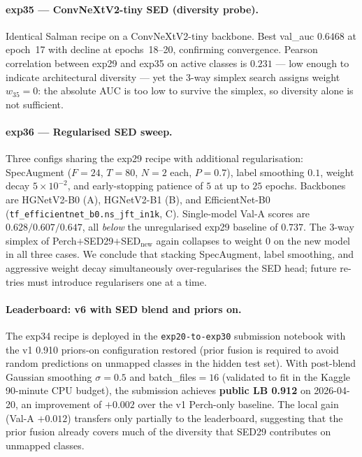 \paragraph{exp35 --- ConvNeXtV2-tiny SED (diversity probe).}
Identical Salman recipe on a ConvNeXtV2-tiny backbone. Best
val\_auc $0.6468$ at epoch~17 with decline at epochs~18--20, confirming
convergence. Pearson correlation between exp29 and exp35 on active
classes is $0.231$ --- low enough to indicate architectural diversity
--- yet the 3-way simplex search assigns weight $w_{35}{=}0$: the
absolute AUC is too low to survive the simplex, so diversity alone
is not sufficient.

\paragraph{exp36 --- Regularised SED sweep.}
Three configs sharing the exp29 recipe with additional regularisation:
SpecAugment ($F{=}24$, $T{=}80$, $N{=}2$ each, $P{=}0.7$), label
smoothing $0.1$, weight decay $5{\times}10^{-2}$, and early-stopping
patience of $5$ at up to $25$ epochs. Backbones are HGNetV2-B0 (A),
HGNetV2-B1 (B), and EfficientNet-B0
(\texttt{tf\_efficientnet\_b0.ns\_jft\_in1k}, C). Single-model Val-A
scores are $0.628/0.607/0.647$, all \emph{below} the unregularised
exp29 baseline of $0.737$. The 3-way simplex of
Perch$+$SED29$+$SED$_\text{new}$ again collapses to weight $0$ on the
new model in all three cases. We conclude that stacking SpecAugment,
label smoothing, and aggressive weight decay simultaneously
over-regularises the SED head; future re-tries must introduce
regularisers one at a time.

\paragraph{Leaderboard: v6 with SED blend and priors on.}
The exp34 recipe is deployed in the \texttt{exp20-to-exp30} submission
notebook with the v1 0.910 priors-on configuration restored (prior
fusion is required to avoid random predictions on unmapped classes in
the hidden test set). With post-blend Gaussian smoothing $\sigma{=}0.5$
and batch\_files$=16$ (validated to fit in the Kaggle 90-minute CPU
budget), the submission achieves \textbf{public LB 0.912} on
2026-04-20, an improvement of $+0.002$ over the v1 Perch-only
baseline. The local gain (Val-A $+0.012$) transfers only partially to
the leaderboard, suggesting that the prior fusion already covers much
of the diversity that SED29 contributes on unmapped classes.

